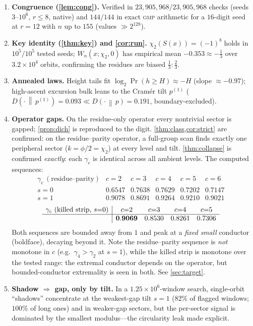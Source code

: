 \documentclass[11pt]{article}
\newcommand{\KL}[2]{D\!\left(#1\,\middle\|\,#2\right)}
\theoremstyle{plain}
\theoremstyle{definition}
\theoremstyle{remark}
\begin{document}
\begin{enumerate}[leftmargin=1.6em]
\item \textbf{Congruence (\cref{lem:cong}).} Verified in
$23{,}905{,}968/23{,}905{,}968$ checks (seeds $3$--$10^6$, $r\le8$, native) and
$144/144$ in exact \textsc{gmp} arithmetic for a $16$-digit seed at $r=12$ with
$n$ up to $155$ (values $\gg2^{128}$).
\item \textbf{Key identity (\cref{thm:key}) and \cref{cor:run}.}
$\chi_2(S(x))=(-1)^b$ holds in $10^5/10^5$ tested seeds;
$W_n(x;\chi_2,0)$ has empirical mean $-0.353\approx-\tfrac13$ over
$3.2\times10^4$ orbits, confirming the residues are biased $\tfrac13:\tfrac23$.
\item \textbf{Annealed laws.} Height tails fit $\log_2\Pr(h\ge H)\approx-H$
(slope $\approx-0.97$); high-ascent excursion bulk leans to the Cram\'er tilt
$p^{(1)}$ ($\KL{\cdot}{p^{(1)}}=0.093\ll\KL{\cdot}{p}=0.191$, boundary-excluded).
\item \textbf{Operator gaps.} On the residue-only operator every nontrivial
sector is gapped; \cref{prop:dich} is reproduced to the digit.
\cref{thm:class,cor:strict} are confirmed: on the residue--parity operator, a
full-group scan finds exactly one peripheral sector ($k=\phi/2=\chi_2$) at every
level and tilt. \cref{thm:collapse} is confirmed \emph{exactly}: each $\gamma_c$
is identical across all ambient levels. The computed sequences:
\[
\begin{array}{c|ccccc}
\gamma_c\ (\text{residue--parity}) & c{=}2 & c{=}3 & c{=}4 & c{=}5 & c{=}6\\\hline
s=0 & 0.6547 & \mathbf{0.7638} & 0.7629 & 0.7202 & 0.7147\\
s=1 & 0.9078 & 0.8691 & \mathbf{0.9264} & 0.9210 & 0.9021
\end{array}
\]
\[
\begin{array}{c|cccc}
\gamma_c\ (\text{killed strip},\,s{=}0) & c{=}2 & c{=}3 & c{=}4 & c{=}5\\\hline
 & \mathbf{0.9069} & 0.8530 & 0.8261 & 0.7306
\end{array}
\]
Both sequences are bounded away from $1$ and peak at a \emph{fixed small}
conductor (boldface), decaying beyond it. Note the residue--parity sequence is
\emph{not} monotone in $c$ (e.g.\ $\gamma_4>\gamma_2$ at $s{=}1$), while the
killed strip is monotone over the tested range: the extremal conductor depends on
the operator, but bounded-conductor extremality is seen in both. See
\cref{sec:target}.
\item \textbf{Shadow $\Rightarrow$ gap, only by tilt.} In a $1.25\times10^6$-window
search, single-orbit ``shadows'' concentrate at the weakest-gap tilt $s=1$ ($82\%$
of flagged windows; $100\%$ of long ones) and in weaker-gap sectors, but the
per-sector signal is dominated by the smallest modulus---the circularity leak made
explicit.
\end{enumerate}
\end{document}
